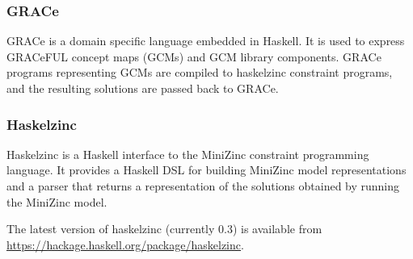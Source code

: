 \subsubsection*{GRACe}

GRACe is a domain specific language embedded in Haskell.
%
It is used to express GRACeFUL concept maps (GCMs) and GCM library
components.
%
GRACe programs representing GCMs are compiled to haskelzinc constraint
programs, and the resulting solutions are passed back to GRACe.

\subsubsection*{Haskelzinc}

Haskelzinc is a Haskell interface to the MiniZinc constraint
programming language.
%
It provides a Haskell DSL for building MiniZinc model representations and a parser that returns a representation of the solutions obtained
by running the MiniZinc model.

The latest version of haskelzinc (currently 0.3) is available from
\url{https://hackage.haskell.org/package/haskelzinc}.

